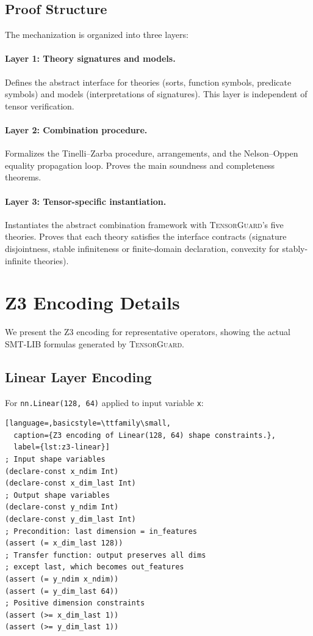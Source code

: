 \documentclass[10pt]{article}
\newcommand{\tguard}{\textsc{TensorGuard}}
\theoremstyle{plain}
\theoremstyle{definition}
\theoremstyle{remark}
\begin{document}
\subsection{Proof Structure}

The mechanization is organized into three layers:

\paragraph{Layer 1: Theory signatures and models.}
Defines the abstract interface for theories (sorts, function
symbols, predicate symbols) and models (interpretations of
signatures).  This layer is independent of tensor verification.

\paragraph{Layer 2: Combination procedure.}
Formalizes the Tinelli--Zarba procedure, arrangements, and the
Nelson--Oppen equality propagation loop.  Proves the main
soundness and completeness theorems.

\paragraph{Layer 3: Tensor-specific instantiation.}
Instantiates the abstract combination framework with \tguard{}'s
five theories.  Proves that each theory satisfies the interface
contracts (signature disjointness, stable infiniteness or
finite-domain declaration, convexity for stably-infinite theories).


\section{Z3 Encoding Details}\label{app:z3}

We present the Z3 encoding for representative operators, showing
the actual SMT-LIB formulas generated by \tguard{}.

\subsection{Linear Layer Encoding}

For \texttt{nn.Linear(128, 64)} applied to input variable
\texttt{x}:

\begin{lstlisting}[language=,basicstyle=\ttfamily\small,
  caption={Z3 encoding of Linear(128, 64) shape constraints.},
  label={lst:z3-linear}]
; Input shape variables
(declare-const x_ndim Int)
(declare-const x_dim_last Int)
; Output shape variables
(declare-const y_ndim Int)
(declare-const y_dim_last Int)
; Precondition: last dimension = in_features
(assert (= x_dim_last 128))
; Transfer function: output preserves all dims
; except last, which becomes out_features
(assert (= y_ndim x_ndim))
(assert (= y_dim_last 64))
; Positive dimension constraints
(assert (>= x_dim_last 1))
(assert (>= y_dim_last 1))
\end{lstlisting}
\end{document}
